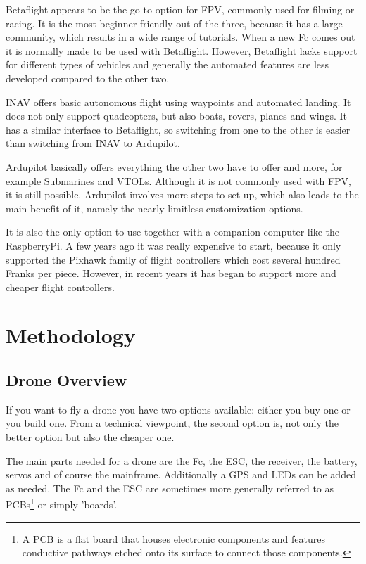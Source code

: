 \documentclass[svgnames]{article}
\begin{document}
	Betaflight appears to be the go-to option for \gls{FPV}, commonly used for filming or racing. It is the most beginner friendly out of the three, because it has a large community, which results in a wide range of tutorials. When a new \gls{Fc} comes out it is normally made to be used with Betaflight. However, Betaflight lacks support for different types of vehicles and generally the automated features are less developed compared to the other two. 
	
	INAV offers basic autonomous flight using waypoints and automated landing. It does not only support quadcopters, but also boats, rovers, planes and wings. It has a similar interface to Betaflight, so switching from one to the other is easier than switching from INAV to Ardupilot.
	
	Ardupilot basically offers everything the other two have to offer and more, for example Submarines and VTOLs. Although it is not commonly used with \gls{FPV}, it is still possible. Ardupilot involves more steps to set up, which also leads to the main benefit of it, namely the nearly limitless customization options.
	
	It is also the only option to use together with a companion computer like the RaspberryPi. A few years ago it was really expensive to start, because it only supported the Pixhawk family of flight controllers which cost several hundred Franks per piece. However, in recent years it has began to support more and cheaper flight controllers.
	
	\section{Methodology}
	\subsection{Drone Overview}
	If you want to fly a drone you have two options available: either you buy one or you build one. From a technical viewpoint, the second option is, not only the better option but also the cheaper one.
	
	The main parts needed for a drone are the \gls{Fc}, the \gls{ESC}, the receiver, the battery, servos and of course the mainframe. Additionally a \gls{GPS} and LEDs can be added as needed. The \gls{Fc} and the \gls{ESC} are sometimes more generally referred to as \glspl{PCB}\footnote{A \gls{PCB} is a flat board that houses electronic components and features conductive pathways etched onto its surface to connect those components.} or simply 'boards'.
\end{document}
